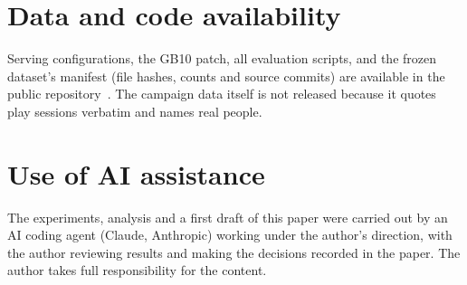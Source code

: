 \documentclass[11pt]{article}
\begin{document}
\section*{Data and code availability}
Serving configurations, the GB10 patch, all evaluation scripts, and the frozen dataset's manifest
(file hashes, counts and source commits) are available in the public repository~\cite{dgxfun}. The
campaign data itself is not released because it quotes play sessions verbatim and names real people.

\section*{Use of AI assistance}
The experiments, analysis and a first draft of this paper were carried out by an AI coding agent
(Claude, Anthropic) working under the author's direction, with the author reviewing results and
making the decisions recorded in the paper. The author takes full responsibility for the content.
\end{document}
